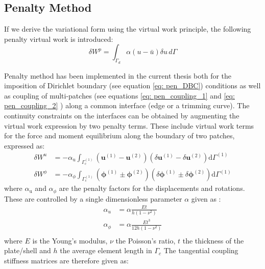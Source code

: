 \documentclass[12pt, a4paper]{report}
\begin{document}
\subsection{Penalty Method}
If we derive the variational form using the virtual work principle, the following penalty virtual work is introduced:
\begin{equation}\label{eq: pen_DBC}
    \delta W^{p} = \int_{\Gamma_{d}} \alpha (u-\bar{u})\delta u \,d\Gamma
\end{equation}
\par
Penalty method has been implemented in the current thesis both for the imposition of Dirichlet boundary (see equation \ref{eq: pen_DBC}) conditions as well as coupling of multi-patches (see equations \ref{eq: pen_coupling_1} and \ref{eq: pen_coupling_2} ) along a common interface (edge or a trimming curve). The continuity constraints on the interfaces can be obtained by augmenting the virtual work expression by two penalty terms. These include virtual work terms for the force and moment equilibrium along the boundary of two patches, expressed as\cite{BREITENBERGER2015401}:
\begin{align}\label{eq: pen_coupling_1}
    \delta W^{u} &= -\alpha_{\text {u}} \int_{\Gamma_{\mathrm{c}}^{(1)}}\left(\mathbf{u}^{(1)}-\mathbf{u}^{(2)}\right)\left(\delta \mathbf{u}^{(1)}-\delta \mathbf{u}^{(2)}\right) \mathrm{d} \Gamma_{\mathrm{}}^{(1)}
    \\\label{eq: pen_coupling_2}
    \delta W^{\phi} &= -\alpha_{\phi} \int_{\Gamma_{\mathrm{c}}^{(1)}}\left(\boldsymbol{\phi}^{(1)}\pm \boldsymbol{\phi}^{(2)}\right)\left(\delta \boldsymbol{\phi}^{(1)}\pm \delta \boldsymbol{\phi}^{(2)}\right) \mathrm{d} \Gamma_{\mathrm{}}^{(1)}
\end{align}
where $\alpha_{\text {u}}$ and $\alpha_{\phi}$ are the penalty factors for the displacements and rotations. These are controlled by a single dimensionless parameter $\alpha$ given as \cite{jos_kind_shell_penalty}:
\begin{align}
    \alpha_u&=\alpha \frac{Et}{h(1-\nu^2)}\\
    \alpha_{\phi}&=\alpha \frac{Et^3}{12h(1-\nu^2)}\\
\end{align}
where $E$ is the Young's modulus, $\nu$ the Poisson's ratio, $t$ the thickness of the plate/shell and $h$ the average element length in $\Gamma_c$
The tangential coupling stiffness matrices are therefore given as:
\end{document}
